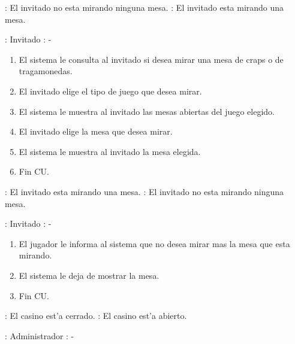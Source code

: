 : El invitado no esta mirando ninguna mesa. \newline
\indent{}: El invitado esta mirando una mesa.

: Invitado \newline
\indent{}: -

\begin{enumerate}
\item El sistema le consulta al invitado si desea mirar una mesa de craps o de tragamonedas.
\item El invitado elige el tipo de juego que desea mirar.
\item El sistema le muestra al invitado las mesas abiertas del juego elegido.
\item El invitado elige la mesa que desea mirar.
\item El sistema le muestra al invitado la mesa elegida.
\item Fin CU.
\end{enumerate}




: El invitado esta mirando una mesa. \newline
\indent{}: El invitado no esta mirando ninguna mesa.

: Invitado \newline
\indent{}: -

\begin{enumerate}
\item El jugador le informa al sistema que no desea mirar mas la mesa que esta mirando.
\item El sistema le deja de mostrar la mesa.
\item Fin CU.
\end{enumerate}




: El casino est'a cerrado. \newline
\indent{}: El casino est'a abierto.

: Administrador \newline
\indent{}: -

